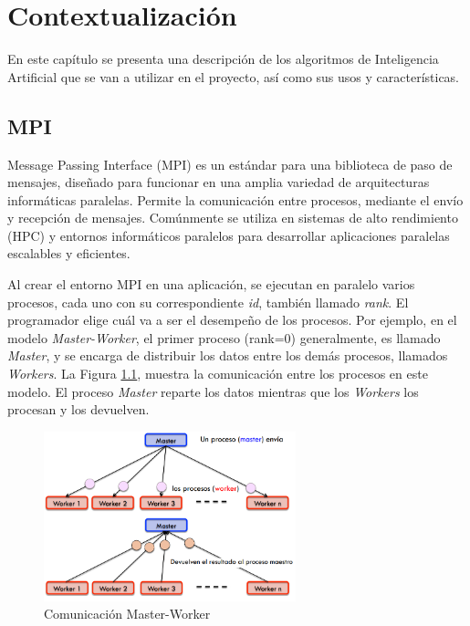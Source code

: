 \chapter{Contextualización}
\label{cap:c2_context}



	En este capítulo se presenta una descripción de los algoritmos de Inteligencia Artificial que se van a utilizar en el proyecto, así como sus usos y características. 
	

\section{MPI}

	Message Passing Interface\cite{barker2015message}  (MPI)  es un estándar para una biblioteca de paso de mensajes, diseñado para funcionar en una amplia variedad de arquitecturas informáticas paralelas. Permite la comunicación entre procesos, mediante el envío y recepción de mensajes. Comúnmente se utiliza en sistemas de alto rendimiento\cite{stone1990high} (HPC) y entornos informáticos paralelos para desarrollar aplicaciones paralelas escalables y eficientes.
	
	
	Al crear el entorno MPI en una aplicación, se ejecutan en paralelo varios procesos, cada uno con su correspondiente \textit{id}, también llamado \textit{rank}. El programador elige cuál va a ser el desempeño de los procesos. Por ejemplo, en el modelo \textit{Master-Worker}, el primer proceso (rank=0) generalmente, es llamado \textit{Master}, y se encarga de distribuir los datos entre los demás procesos, llamados \textit{Workers}. La Figura \ref{fig:comunicacion_mw}, muestra la comunicación entre los procesos en este modelo. El proceso \textit{Master} reparte los datos mientras que los \textit{Workers} los procesan y los devuelven.


	\begin{figure}[!h]
		\centering
		\includegraphics[width=0.65\textwidth]{images/chapter_2/mpi_1}
		\caption{Comunicación Master-Worker}
		\label{fig:comunicacion_mw}
	\end{figure}

